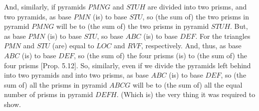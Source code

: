 \begin{Parallel}{}{}
{And, similarly, if pyramids $PMNG$ and $STUH$ are divided into two prisms, and
two pyramids, as base $PMN$ (is) to base $STU$, so (the sum of) the  two prisms in pyramid
$PMNG$ will be to (the sum of) the  two prisms in pyramid $STUH$. But, as base $PMN$ (is) to
base $STU$, so base $ABC$ (is) to base $DEF$. For  the triangles $PMN$ and
$STU$ (are) equal to $LOC$ and $RVF$, respectively. And, thus, as base $ABC$ (is)
to base $DEF$, so (the sum of) the four prisms (is) to (the sum of) the four prisms [Prop. 5.12].
So, similarly, even if we  divide the pyramids left behind into two pyramids
and into two prisms, as base $ABC$ (is) to base $DEF$, so (the sum of) all the prisms in pyramid
$ABCG$ will be to (the sum of) all the equal number of prisms in pyramid $DEFH$. (Which is) the
very thing it was required to show.}
\end{Parallel}

